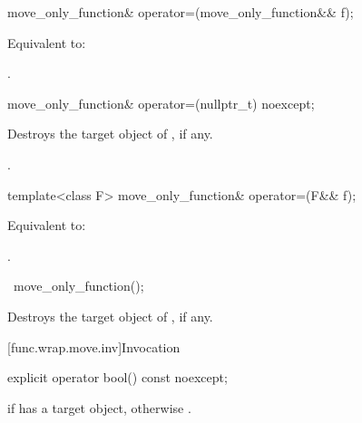 %
\begin{itemdecl}
move_only_function& operator=(move_only_function&& f);
\end{itemdecl}

\begin{itemdescr}
\pnum
\effects
Equivalent to: 

\pnum
\returns
{}.
\end{itemdescr}

%
\begin{itemdecl}
move_only_function& operator=(nullptr_t) noexcept;
\end{itemdecl}

\begin{itemdescr}
\pnum
\effects
Destroys the target object of , if any.

\pnum
\returns
{}.
\end{itemdescr}

%
\begin{itemdecl}
template<class F> move_only_function& operator=(F&& f);
\end{itemdecl}

\begin{itemdescr}
\pnum
\effects
Equivalent to: 

\pnum
\returns
{}.
\end{itemdescr}

%
\begin{itemdecl}
~move_only_function();
\end{itemdecl}

\begin{itemdescr}
\pnum
\effects
Destroys the target object of , if any.
\end{itemdescr}

[func.wrap.move.inv]{Invocation}

%
\begin{itemdecl}
explicit operator bool() const noexcept;
\end{itemdecl}

\begin{itemdescr}
\pnum
\returns
{} if  has a target object, otherwise .
\end{itemdescr}


